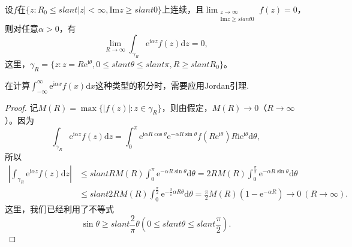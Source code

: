 \documentclass[../../main.tex]{subfiles}
\begin{document}
\begin{lemma}[Jordan引理]\label{lemma:Jordan引理}
设$f$在$\{ z: R_0 \leqslant slant |z| < \infty, \mathrm{Im} z \geqslant slant 0 \}$上连续，且$\lim_{\substack{z \to \infty \\ \mathrm{Im} z \geqslant slant 0}} f(z) = 0$，则对任意$\alpha > 0$，有
\[
\lim_{R \to \infty} \int_{\gamma_R} \mathrm{e}^{\mathrm{i}\alpha z} f(z) \mathrm{d}z = 0,
\]
这里，$\gamma_R = \{ z: z = R\mathrm{e}^{\mathrm{i}\theta}, 0 \leqslant slant \theta \leqslant slant \pi, R \geqslant slant R_0 \}$。
\end{lemma}
\begin{remark}
在计算$\int_{-\infty}^{\infty} \mathrm{e}^{\mathrm{i}\alpha x} f(x) \mathrm{d}x$这种类型的积分时，需要应用Jordan引理.
\end{remark}
\begin{proof}
记$M(R) = \max\{ |f(z)| : z \in \gamma_R \}$，则由假定，$M(R) \to 0$（$R \to \infty$）。因为
\[
\int_{\gamma_R} \mathrm{e}^{\mathrm{i}\alpha z} f(z) \mathrm{d}z = \int_{0}^{\pi} \mathrm{e}^{\mathrm{i}\alpha R\cos\theta} \mathrm{e}^{-\alpha R\sin\theta} f(R\mathrm{e}^{\mathrm{i}\theta}) R\mathrm{i}\mathrm{e}^{\mathrm{i}\theta} \mathrm{d}\theta,
\]
所以
\begin{align*}
\left| \int_{\gamma_R} \mathrm{e}^{\mathrm{i}\alpha z} f(z) \mathrm{d}z \right| &\leqslant slant R M(R) \int_{0}^{\pi} \mathrm{e}^{-\alpha R\sin\theta} \mathrm{d}\theta
= 2 R M(R) \int_{0}^{\frac{\pi}{2}} \mathrm{e}^{-\alpha R\sin\theta} \mathrm{d}\theta
\\
&\leqslant slant 2 R M(R) \int_{0}^{\frac{\pi}{2}} \mathrm{e}^{-\frac{2}{\pi}\alpha R\theta} \mathrm{d}\theta
= \frac{\pi}{2} M(R) (1 - \mathrm{e}^{-\alpha R})
\to 0 \ (R \to \infty).
\end{align*}
这里，我们已经利用了不等式
\[
\sin\theta \geqslant slant \frac{2}{\pi}\theta \left( 0 \leqslant slant \theta \leqslant slant \frac{\pi}{2} \right).
\]
\end{proof}
\end{document}
